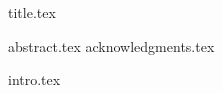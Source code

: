 \documentclass[a4paper, 12pt]{report}
\begin{document}
{title.tex}



\setcounter{tocdepth}{4}





{abstract.tex}
{acknowledgments.tex}


\tableofcontents
\newpage

\listoffigures
\newpage

\listoftables

\clearpage


\printglossary[nonumberlist]

\printglossary[type=\acronymtype,nonumberlist]
\newpage




{intro.tex}






\end{document}
